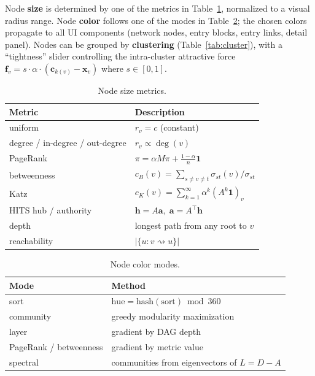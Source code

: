 Node \textbf{size} is determined by one of the metrics in Table~\ref{tab:size}, normalized to a visual radius range. Node \textbf{color} follows one of the modes in Table~\ref{tab:color}; the chosen colors propagate to all UI components (network nodes, entry blocks, entry links, detail panel). Nodes can be grouped by \textbf{clustering} (Table~\ref{tab:cluster}), with a ``tightness'' slider controlling the intra-cluster attractive force $\mathbf{f}_v = s \cdot \alpha \cdot (\mathbf{c}_{k(v)} - \mathbf{x}_v)$ where $s \in [0,1]$.

\begin{table}[H]
\centering
\small
\caption{Node size metrics.}
\label{tab:size}
\begin{tabular}{ll}
\toprule
Metric & Description \\
\midrule
uniform & $r_v = c$ (constant) \\
degree / in-degree / out-degree & $r_v \propto \deg(v)$ \\
PageRank & $\pi = \alpha M\pi + \frac{1-\alpha}{n}\mathbf{1}$ \\
betweenness & $c_B(v) = \sum_{s \neq v \neq t} \sigma_{st}(v) / \sigma_{st}$ \\
Katz & $c_K(v) = \sum_{k=1}^{\infty} \alpha^k (A^k \mathbf{1})_v$ \\
HITS hub / authority & $\mathbf{h} = A\mathbf{a},\; \mathbf{a} = A^\top \mathbf{h}$ \\
depth & longest path from any root to $v$ \\
reachability & $|\{u : v \rightsquigarrow u\}|$ \\
\bottomrule
\end{tabular}
\end{table}

\begin{table}[H]
\centering
\small
\caption{Node color modes.}
\label{tab:color}
\begin{tabular}{ll}
\toprule
Mode & Method \\
\midrule
sort & $\text{hue} = \text{hash}(\text{sort}) \bmod 360$ \\
community & greedy modularity maximization \\
layer & gradient by DAG depth \\
PageRank / betweenness & gradient by metric value \\
spectral & communities from eigenvectors of $L = D - A$ \\
\bottomrule
\end{tabular}
\end{table}

